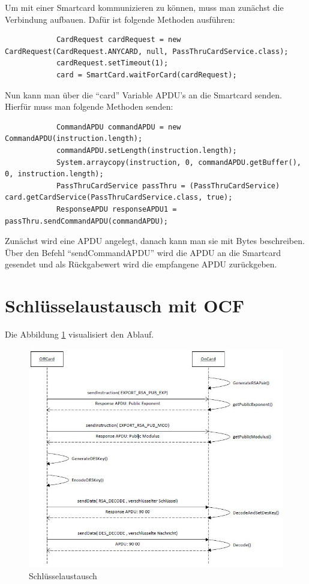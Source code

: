 \documentclass[parskip]{scrartcl}
\begin{document}
		Um mit einer Smartcard kommunizieren zu können, muss man zunächst die Verbindung aufbauen. Dafür ist folgende Methoden ausführen:
		
		\begin{lstlisting}
			CardRequest cardRequest = new CardRequest(CardRequest.ANYCARD, null, PassThruCardService.class);
			cardRequest.setTimeout(1);
			card = SmartCard.waitForCard(cardRequest);
		\end{lstlisting}
		
		Nun kann man über die \enquote{card} Variable APDU's an die Smartcard senden. Hierfür muss man folgende Methoden senden:
		
		\begin{lstlisting}
			CommandAPDU commandAPDU = new CommandAPDU(instruction.length);
			commandAPDU.setLength(instruction.length);
			System.arraycopy(instruction, 0, commandAPDU.getBuffer(), 0, instruction.length);
			PassThruCardService passThru = (PassThruCardService) card.getCardService(PassThruCardService.class, true);
			ResponseAPDU responseAPDU1 = passThru.sendCommandAPDU(commandAPDU);
		\end{lstlisting}
		
		Zunächst wird eine APDU angelegt, danach kann man sie mit Bytes beschreiben. Über den Befehl \enquote{sendCommandAPDU} wird die APDU an die Smartcard gesendet und als Rückgabewert wird die empfangene APDU zurückgeben.
		
	\section{Schlüsselaustausch mit OCF}
		Die Abbildung \ref{fig:KeyExchange} visualisiert den Ablauf.
		
		\begin{figure}[H]
			\centering
			\includegraphics[width=\linewidth]{./KeyExchange}
			\caption{Schlüsselaustausch}
			\label{fig:KeyExchange}
		\end{figure}
		
\end{document}
